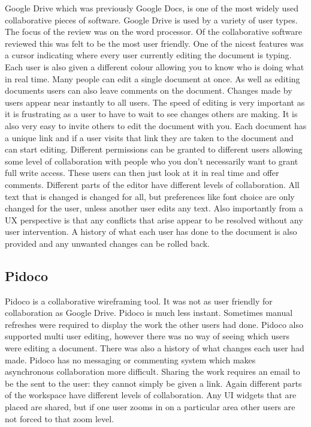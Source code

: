 Google Drive which was previously Google Docs, is one of the most widely used collaborative pieces of software.  Google Drive is used by a variety of user types.  The focus of the review was on the word processor.  Of the collaborative software reviewed this was felt to be the most user friendly.  One of the nicest features was a cursor indicating where every user currently editing the document is typing. Each user is also given a different colour allowing you to know who is doing what in real time.  Many people can edit a single document at once.  As well as editing documents users can also leave comments on the document.  Changes made by users appear near instantly to all users. The speed of editing is very important as it is frustrating as a user to have to wait to see changes others are making.  It is also very easy to invite others to edit the document with you.  Each document has a unique link and if a user visits that link they are taken to the document and can start editing.  Different permissions can be granted to different users allowing some level of collaboration with people who you don't necessarily want to grant full write access. These users can then just look at it in real time and offer comments.  Different parts of the editor have different levels of collaboration.  All text that is changed is changed for all, but preferences like font choice are only changed for the user, unless another user edits any text.  Also importantly from a \ac{UX} perspective is that any conflicts that arise appear to be resolved without any user intervention.  A history of what each user has done to the document is also provided and any unwanted changes can be rolled back.

\subsection{Pidoco}

Pidoco is a collaborative wireframing tool.  It was not as user friendly for collaboration as Google Drive.  Pidoco is much less instant.  Sometimes manual refreshes were required to display the work the other users had done.  Pidoco also supported multi user editing, however there was no way of seeing which users were editing a document. There was also a history of what changes each user had made.  Pidoco has no messaging or commenting system which makes asynchronous collaboration more difficult.  Sharing the work requires an email to be the sent to the user: they cannot simply be given a link.  Again different parts of the workspace have different levels of collaboration.  Any \ac{UI} widgets that are placed are shared, but if one user zooms in on a particular area other users are not forced to that zoom level.


